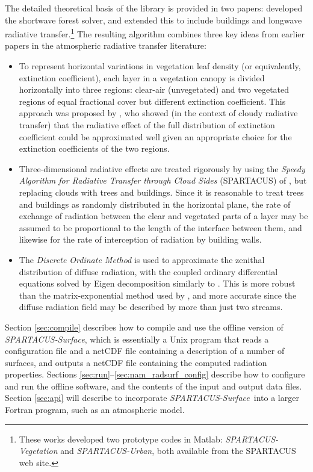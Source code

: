 \documentclass[a4,oneside]{article}
\def\spsurf{\emph{SPARTACUS-Surface}}
\begin{document}
The detailed theoretical basis of the library is provided in two
papers: \cite{Hogan+2018} developed the shortwave forest solver, and
\cite{Hogan2019} extended this to include buildings and longwave
radiative transfer.\footnote{These works developed two prototype codes
  in Matlab: \emph{SPARTACUS-Vegetation} and \emph{SPARTACUS-Urban},
  both available from the SPARTACUS web site.}  The resulting
algorithm combines three key ideas from earlier papers in the
atmospheric radiative transfer literature:
%
\begin{itemize}
\item To represent horizontal variations in vegetation leaf density
  (or equivalently, extinction coefficient), each layer in a
  vegetation canopy is divided horizontally into three regions:
  clear-air (unvegetated) and two vegetated regions of equal
  fractional cover but different extinction coefficient.  This
  approach was proposed by \cite{Shonk+2008}, who showed (in the
  context of cloudy radiative transfer) that the radiative effect of
  the full distribution of extinction coefficient could be
  approximated well given an appropriate choice for the extinction
  coefficients of the two regions.
\item Three-dimensional radiative effects are treated rigorously by
  using the \emph{Speedy Algorithm for Radiative Transfer through
    Cloud Sides} (SPARTACUS) of \cite{Hogan+2016}, but replacing
  clouds with trees and buildings.  Since it is reasonable to treat
  trees and buildings as randomly distributed in the horizontal plane,
  the rate of exchange of radiation between the clear and vegetated
  parts of a layer may be assumed to be proportional to the length of
  the interface between them, and likewise for the rate of
  interception of radiation by building walls.
\item The \emph{Discrete Ordinate Method} is used to approximate the
  zenithal distribution of diffuse radiation, with the coupled
  ordinary differential equations solved by Eigen decomposition
  similarly to \cite{Stamnes+1988}. This is more robust than the
  matrix-exponential method used by \cite{Hogan+2016}, and more
  accurate since the diffuse radiation field may be described by more
  than just two streams.
\end{itemize}

Section \ref{sec:compile} describes how to compile and use the offline
version of \spsurf, which is essentially a Unix program that reads a
configuration file and a netCDF file containing a description of a
number of surfaces, and outputs a netCDF file containing the computed
radiation properties. Sections
\ref{sec:run}--\ref{sec:nam_radsurf_config} describe how to configure
and run the offline software, and the contents of the input and output
data files.  Section \ref{sec:api} will describe to incorporate
\spsurf\ into a larger Fortran program, such as an atmospheric model.
\end{document}

